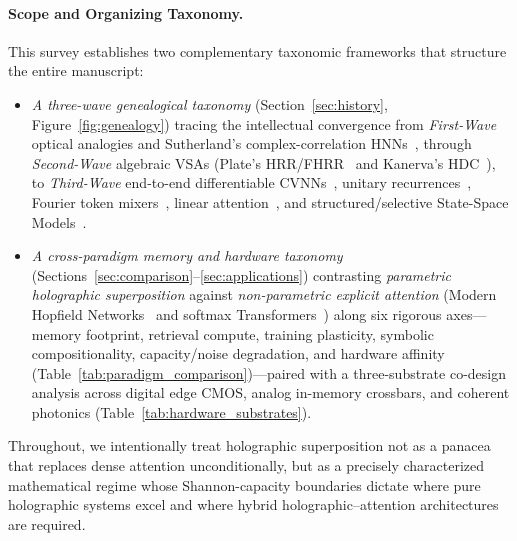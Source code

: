 \paragraph{Scope and Organizing Taxonomy.}
This survey establishes two complementary taxonomic frameworks that structure the entire manuscript:
\begin{itemize}
    \item \emph{A three-wave genealogical taxonomy} (Section~\ref{sec:history}, Figure~\ref{fig:genealogy}) tracing the intellectual convergence from \emph{First-Wave} optical analogies and Sutherland's complex-correlation HNNs~\cite{SUTHERLAND_1990_HNN}, through \emph{Second-Wave} algebraic VSAs (Plate's HRR/FHRR~\cite{PLATE_1995_HRR} and Kanerva's HDC~\cite{KANERVA_2009_HDC}), to \emph{Third-Wave} end-to-end differentiable CVNNs~\cite{TRABELSI_2018_DCN}, unitary recurrences~\cite{ARJOVSKY_2016_URNN}, Fourier token mixers~\cite{LEE_THORP_FNET}, linear attention~\cite{KATHAROPOULOS_2020_LINEAR_TRANSFORMER}, and structured/selective State-Space Models~\cite{GU_SSM_S4_MAMBA}.
    \item \emph{A cross-paradigm memory and hardware taxonomy} (Sections~\ref{sec:comparison}--\ref{sec:applications}) contrasting \emph{parametric holographic superposition} against \emph{non-parametric explicit attention} (Modern Hopfield Networks~\cite{RAMSAUER_MODERN_HOPFIELD} and softmax Transformers~\cite{VASWANI_TRANSFORMER}) along six rigorous axes---memory footprint, retrieval compute, training plasticity, symbolic compositionality, capacity/noise degradation, and hardware affinity (Table~\ref{tab:paradigm_comparison})---paired with a three-substrate co-design analysis across digital edge CMOS, analog in-memory crossbars, and coherent photonics (Table~\ref{tab:hardware_substrates}).
\end{itemize}
Throughout, we intentionally treat holographic superposition not as a panacea that replaces dense attention unconditionally, but as a precisely characterized mathematical regime whose Shannon-capacity boundaries dictate where pure holographic systems excel and where hybrid holographic--attention architectures are required.

